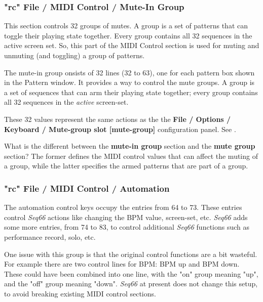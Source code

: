 \subsubsection{"rc" File / MIDI Control / Mute-In Group}
\label{subsubsec:seq66_rc_file_midi_ctrl_mutein}

   This section controls 32 groups of mutes.
   A group is a set of patterns that can toggle their playing state
   together.  Every group contains all 32 sequences in the active screen set.
   So, this part of the MIDI Control section is used for muting and unmuting
   (and toggling) a group of patterns.

   The mute-in group onsists of 32 lines (32 to 63), one for each
   pattern box shown in the Pattern window.
   It provides a way to control the mute groups.
   A group is a set of sequences that can arm their playing state
   together; every group contains all 32 sequences in the
   \textsl{active} screen-set.

   These 32 values represent the same actions as the
   the \textbf{File / Options / Keyboard / Mute-group slot [mute-group]} 
   configuration panel.
   See .

   What is the different between the \textbf{mute-in group}
   section and the \textbf{mute group} section?  The former defines the MIDI
   control values that can affect the muting of a group, while the latter
   specifies the armed patterns that are part of a group.

\subsubsection{"rc" File / MIDI Control / Automation}
\label{subsubsec:seq66_rc_file_midi_ctrl_automation}

   The automation control keys occupy the entries from 64 to 73.
   These entries control
   \textsl{Seq66} actions like changing the BPM value, screen-set, etc.
   \textsl{Seq66} adds some more entries, from 74 to 83, to control
   additional \textsl{Seq66} functions such as performance
   record, solo, etc.
   
   One issue with this group is that the original control functions are a bit
   wasteful.  For example there are two control lines for BPM:  BPM up and BPM
   down.  These could have been combined into one line, with the "on" group
   meaning "up", and the "off" group meaning "down".  
   \textsl{Seq66} at present does not change this setup, to avoid
   breaking existing MIDI control sections.

